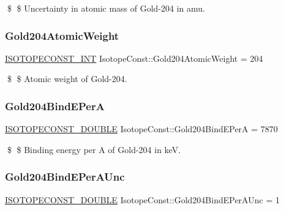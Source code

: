 \$ \$ Uncertainty in atomic mass of Gold-\/204 in amu. \mbox{\label{group___isotope_const-_gold-_au204_gaae7b354b03e0511dec511a666583f4b7}} 
\subsubsection{\texorpdfstring{Gold204\+Atomic\+Weight}{Gold204AtomicWeight}}
{\footnotesize\ttfamily \mbox{\hyperlink{group___isotope_const-_macros_ga5f18360b3e99483a35c32d789e62621c}{I\+S\+O\+T\+O\+P\+E\+C\+O\+N\+S\+T\+\_\+\+I\+NT}} Isotope\+Const\+::\+Gold204\+Atomic\+Weight = 204}

\$ \$ Atomic weight of Gold-\/204. \mbox{\label{group___isotope_const-_gold-_au204_ga608899244534c1861874cf9b6551f3b3}} 
\subsubsection{\texorpdfstring{Gold204\+Bind\+E\+PerA}{Gold204BindEPerA}}
{\footnotesize\ttfamily \mbox{\hyperlink{group___isotope_const-_macros_ga8f45a7272ce02c0b4c65c44636ed719a}{I\+S\+O\+T\+O\+P\+E\+C\+O\+N\+S\+T\+\_\+\+D\+O\+U\+B\+LE}} Isotope\+Const\+::\+Gold204\+Bind\+E\+PerA = 7870}

\$ \$ Binding energy per A of Gold-\/204 in keV. \mbox{\label{group___isotope_const-_gold-_au204_gaa714231bda7e522428846a7fbbf94a19}} 
\subsubsection{\texorpdfstring{Gold204\+Bind\+E\+Per\+A\+Unc}{Gold204BindEPerAUnc}}
{\footnotesize\ttfamily \mbox{\hyperlink{group___isotope_const-_macros_ga8f45a7272ce02c0b4c65c44636ed719a}{I\+S\+O\+T\+O\+P\+E\+C\+O\+N\+S\+T\+\_\+\+D\+O\+U\+B\+LE}} Isotope\+Const\+::\+Gold204\+Bind\+E\+Per\+A\+Unc = 1}

